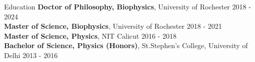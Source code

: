 \documentclass{resume} %
\begin{document}

\begin{rSection}{Education}
   {\bf Doctor of Philosophy, Biophysics}, University of Rochester  \hfill {2018 - 2024}\\
   {\bf Master of Science, Biophysics}, University of Rochester \hfill {2018 - 2021}\\
   {\bf Master of Science, Physics}, NIT Calicut \hfill {2016 - 2018}\\
   {\bf Bachelor of Science, Physics (Honors)}, St.Stephen's College, University of Delhi \hfill {2013 - 2016}


\end{rSection}

\end{document}
